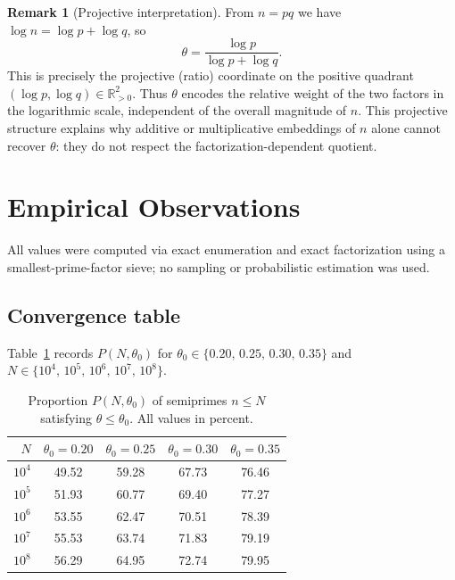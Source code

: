 \documentclass[11pt]{article}
\theoremstyle{definition}
\newtheorem{remark}{Remark}
\begin{document}
\begin{remark}[Projective interpretation]
From \(n = pq\) we have \(\log n = \log p + \log q\), so
\[
  \theta = \frac{\log p}{\log p + \log q}.
\]
This is precisely the projective (ratio) coordinate on the positive quadrant
\((\log p, \log q) \in \mathbb{R}_{>0}^2\).  Thus \(\theta\) encodes the relative
weight of the two factors in the logarithmic scale, independent of the overall
magnitude of \(n\).  This projective structure explains why additive or multiplicative
embeddings of \(n\) alone cannot recover \(\theta\): they do not respect the
factorization-dependent quotient.
\end{remark}


\section{Empirical Observations}

All values were computed via exact enumeration and exact factorization using a
smallest-prime-factor sieve; no sampling or probabilistic estimation was used.

\subsection{Convergence table}

Table~\ref{tab:convergence} records \(P(N,\theta_0)\) for
\(\theta_0 \in \{0.20,\,0.25,\,0.30,\,0.35\}\) and
\(N \in \{10^4,\,10^5,\,10^6,\,10^7,\,10^8\}\).

\begin{table}[ht]
\centering
\caption{Proportion \(P(N,\theta_0)\) of semiprimes \(n \leq N\) satisfying
  \(\theta \leq \theta_0\).  All values in percent.}
\label{tab:convergence}
\begin{tabular}{rcccc}
\toprule
\(N\) & \(\theta_0 = 0.20\) & \(\theta_0 = 0.25\) & \(\theta_0 = 0.30\) & \(\theta_0 = 0.35\) \\
\midrule
\(10^4\) & 49.52 & 59.28 & 67.73 & 76.46 \\
\(10^5\) & 51.93 & 60.77 & 69.40 & 77.27 \\
\(10^6\) & 53.55 & 62.47 & 70.51 & 78.39 \\
\(10^7\) & 55.53 & 63.74 & 71.83 & 79.19 \\
\(10^8\) & 56.29 & 64.95 & 72.74 & 79.95 \\
\bottomrule
\end{tabular}
\end{table}
\end{document}
